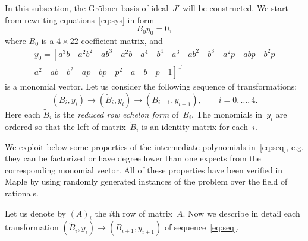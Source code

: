 \documentclass[reqno]{amsart}
\theoremstyle{plain}
\begin{document}
In this subsection, the Gr\"{o}bner basis of ideal~$J'$ will be constructed. We start from rewriting equations~\eqref{eq:sys} in form
\begin{equation}
B_0 y_0 = 0,
\end{equation}
where $B_0$ is a $4\times 22$ coefficient matrix, and
\begin{multline}
y_0 =
\left[a^3b \quad a^2b^2 \quad ab^3 \quad a^2b \quad a^4 \quad b^4 \quad a^3 \quad ab^2 \quad b^3 \quad a^2p \quad abp \quad b^2p \right.\\ \left. a^2 \quad ab \quad b^2 \quad ap \quad bp \quad p^2 \quad a \quad b \quad p \quad 1\right]^{\mathrm T}
\end{multline}
is a monomial vector. Let us consider the following sequence of transformations:
\begin{equation}
\label{eq:seq}
(B_i, y_i) \to (\tilde B_i, y_i) \to (B_{i + 1}, y_{i + 1}), \qquad i = 0, \ldots, 4.
\end{equation}
Here each $\tilde B_i$ is the \emph{reduced row echelon form} of~$B_i$. The monomials in~$y_i$ are ordered so that the left of matrix~$\tilde B_i$ is an identity matrix for each~$i$.

We exploit below some properties of the intermediate polynomials in~\eqref{eq:seq}, e.g. they can be factorized or have degree lower than one expects from the corresponding monomial vector. All of these properties have been verified in Maple by using randomly generated instances of the problem over the field of rationals.

Let us denote by $(A)_i$ the $i$th row of matrix~$A$. Now we describe in detail each transformation $(\tilde B_i, y_i) \to (B_{i + 1}, y_{i + 1})$ of sequence~\eqref{eq:seq}.
\end{document}
